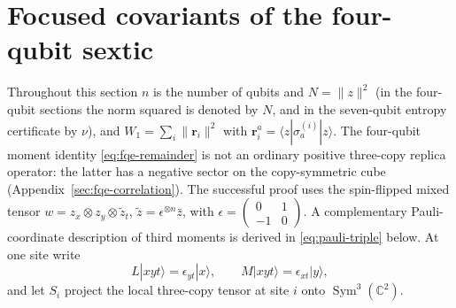 \section{Focused covariants of the four-qubit sextic}\label{sec:sextic-general}

Throughout this section $n$ is the number of qubits and $N=\|z\|^2$ (in the four-qubit
sections the norm squared is denoted by $N$, and in the seven-qubit entropy certificate by $\nu$), and $W_1=\sum_i\|\mathbf r_i\|^2$ with
$\mathbf r_i^a=\langle z|\sigma_a^{(i)}|z\rangle$.
The four-qubit moment identity \eqref{eq:fqe-remainder} is not an ordinary positive
three-copy replica operator: the latter has a negative sector on the
copy-symmetric cube (Appendix~\ref{sec:fqe-correlation}).
The successful proof uses the spin-flipped mixed tensor
$w=z_x\otimes z_y\otimes\widetilde z_t$,
$\widetilde z=\epsilon^{\otimes n}\bar z$, with
$\epsilon=\left(\begin{smallmatrix}0&1\\-1&0\end{smallmatrix}\right)$.
A complementary Pauli-coordinate description of third moments is derived in
\eqref{eq:pauli-triple} below.
At one site write
\[
 L|xyt\rangle=\epsilon_{yt}|x\rangle,\qquad
 M|xyt\rangle=\epsilon_{xt}|y\rangle,
\]
and let $S_i$ project the local three-copy tensor at site $i$ onto
$\operatorname{Sym}^3(\mathbb C^2)$.

